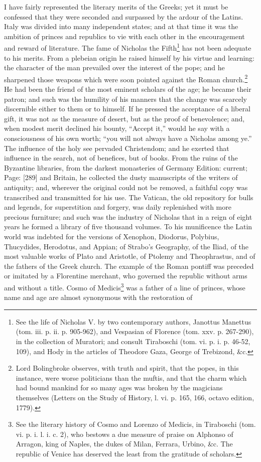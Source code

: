 I have fairly represented the literary merits of the Greeks; yet it must be confessed that they were seconded and surpassed by the ardour of the Latins. Italy was divided into many independent states; and at that time it was the ambition of princes and republics to vie with each other in the encouragement and reward of literature. The fame of Nicholas the Fifth\footnote{See the life of Nicholas V. by two contemporary authors, Janottus Manettus (tom. iii. p. ii. p. 905-962), and Vespasian of Florence (tom. xxv. p. 267-290), in the collection of Muratori; and consult Tiraboschi (tom. vi. p. i. p. 46-52, 109), and Hody in the articles of Theodore Gaza, George of Trebizond, \&c.} has not been adequate to his merits. From a plebeian origin he raised himself by his virtue and learning: the character of the man prevailed over the interest of the pope; and he sharpened those weapons which were soon pointed against the Roman church.\footnote{Lord Bolingbroke observes, with truth and spirit, that the popes, in this instance, were worse politicians than the muftis, and that the charm which had bound mankind for so many ages was broken by the magicians themselves (Letters on the Study of History, l. vi. p. 165, 166, octavo edition, 1779).} He had been the friend of the most eminent scholars of the age; he became their patron; and such was the humility of his manners that the change was scarcely discernible either to them or to himself. If he pressed the acceptance of a liberal gift, it was not as the measure of desert, but as the proof of benevolence; and, when modest merit declined his bounty, \texthebrew{“}Accept it,\texthebrew{}” would he say with a consciousness of his own worth; \texthebrew{“}you will not always have a Nicholas among ye.\texthebrew{}” The influence of the holy see pervaded Christendom; and he exerted that influence in the search, not of benefices, but of books. From the ruins of the Byzantine libraries, from the darkest monasteries of Germany Edition: current; Page: [289] and Britain, he collected the dusty manuscripts of the writers of antiquity; and, wherever the original could not be removed, a faithful copy was transcribed and transmitted for his use. The Vatican, the old repository for bulls and legends, for superstition and forgery, was daily replenished with more precious furniture; and such was the industry of Nicholas that in a reign of eight years he formed a library of five thousand volumes. To his munificence the Latin world was indebted for the versions of Xenophon, Diodorus, Polybius, Thucydides, Herodotus, and Appian; of Strabo\texthebrew{}’s Geography, of the Iliad, of the most valuable works of Plato and Aristotle, of Ptolemy and Theophrastus, and of the fathers of the Greek church. The example of the Roman pontiff was preceded or imitated by a Florentine merchant, who governed the republic without arms and without a title. Cosmo of Medicis\footnote{See the literary history of Cosmo and Lorenzo of Medicis, in Tiraboschi (tom. vi. p. i. l. i. c. 2), who bestows a due measure of praise on Alphonso of Arragon, king of Naples, the dukes of Milan, Ferrara, Urbino, \&c. The republic of Venice has deserved the least from the gratitude of scholars.} was a father of a line of princes, whose name and age are almost synonymous with the restoration of 